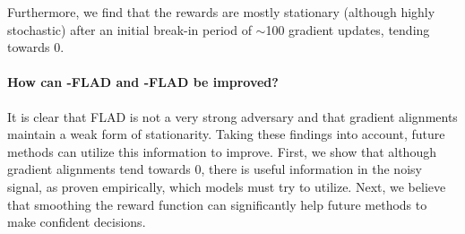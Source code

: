 Furthermore, we find that the rewards are mostly stationary (although highly stochastic) after an initial break-in period of $\sim$100 gradient updates, tending towards 0.

\paragraph{How can \ex{}-FLAD and \ucb{}-FLAD be improved?}
It is clear that FLAD is not a very strong adversary and that gradient alignments maintain a weak form of stationarity. Taking these findings into account, future methods can utilize this information to improve. First, we show that although gradient alignments tend towards 0, there is useful information in the noisy signal, as proven empirically, which models must try to utilize. Next, we believe that smoothing the reward function can significantly help future methods to make confident decisions. 






